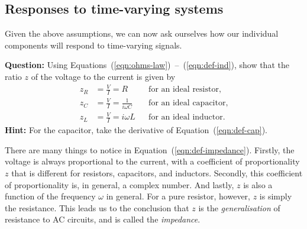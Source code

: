 \subsection*{Responses to time-varying systems}

Given the above assumptions, we can now ask ourselves how our individual components will respond to time-varying signals. 

\begin{question}
    \textbf{Question:} Using Equations~(\ref{eqn:ohms-law})~--~(\ref{eqn:def-ind}), show that the ratio $z$ of the voltage to the current is given by
    \begin{equation}
        \begin{aligned}
            z_R &= \frac{V}{I} = R &&\text{for an ideal resistor}, \\[10pt]
            z_C &= \frac{V}{I} = \frac{1}{i\omega C} &&\text{for an ideal capacitor}, \\[10pt]
            z_L &= \frac{V}{I} = i \omega L &&\text{for an ideal inductor}.
        \end{aligned}
        \label{eqn:def-impedance}
    \end{equation}
    \textbf{Hint:} For the capacitor, take the derivative of Equation~(\ref{eqn:def-cap}).
\end{question}

There are many things to notice in Equation~(\ref{eqn:def-impedance}). Firstly, the voltage is always proportional to the current, with a coefficient of proportionality $z$ that is different for resistors, capacitors, and inductors. Secondly, this coefficient of proportionality is, in general, a complex number. And lastly, $z$ is also a function of the frequency $\omega$ in general. For a pure resistor, however, $z$ is simply the resistance. This leads us to the conclusion that $z$ is the \textsl{generalisation} of resistance to AC circuits, and is called the \textsl{impedance}.



